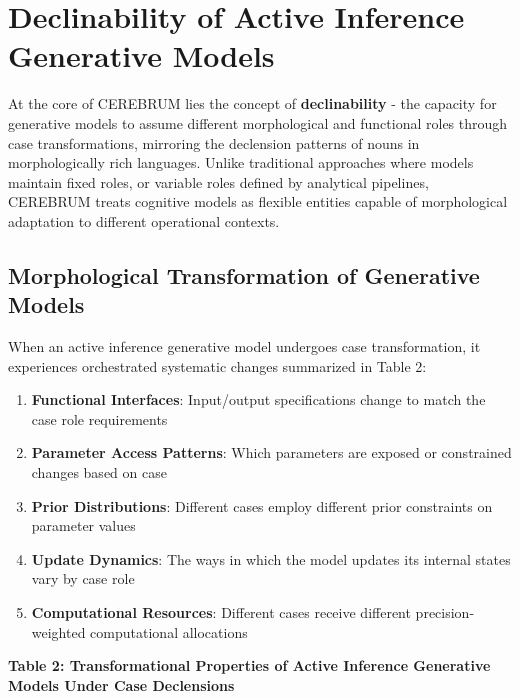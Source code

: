 \hypertarget{declinability-of-active-inference-generative-models}{%
\section{Declinability of Active Inference Generative
Models}\label{declinability-of-active-inference-generative-models}}

At the core of CEREBRUM lies the concept of \textbf{declinability} - the
capacity for generative models to assume different morphological and
functional roles through case transformations, mirroring the declension
patterns of nouns in morphologically rich languages. Unlike traditional
approaches where models maintain fixed roles, or variable roles defined
by analytical pipelines, CEREBRUM treats cognitive models as flexible
entities capable of morphological adaptation to different operational
contexts.

\hypertarget{morphological-transformation-of-generative-models}{%
\subsection{Morphological Transformation of Generative
Models}\label{morphological-transformation-of-generative-models}}

When an active inference generative model undergoes case transformation,
it experiences orchestrated systematic changes summarized in Table 2:

\begin{enumerate}
\def\labelenumi{\arabic{enumi}.}
\tightlist
\item
  \textbf{Functional Interfaces}: Input/output specifications change to
  match the case role requirements
\item
  \textbf{Parameter Access Patterns}: Which parameters are exposed or
  constrained changes based on case
\item
  \textbf{Prior Distributions}: Different cases employ different prior
  constraints on parameter values
\item
  \textbf{Update Dynamics}: The ways in which the model updates its
  internal states vary by case role
\item
  \textbf{Computational Resources}: Different cases receive different
  precision-weighted computational allocations
\end{enumerate}

\textbf{Table 2: Transformational Properties of Active Inference
Generative Models Under Case Declensions}

